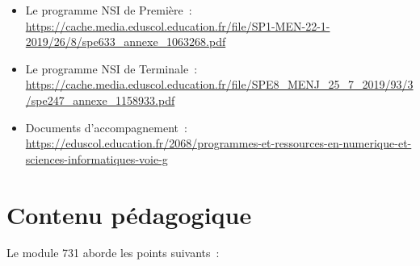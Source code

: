 \documentclass[french]{article}
\begin{document}
\begin{itemize}
    \item Le programme NSI de Première~:\\ \url{https://cache.media.eduscol.education.fr/file/SP1-MEN-22-1-2019/26/8/spe633_annexe_1063268.pdf}
    \item Le programme NSI de Terminale~:\\ \url{https://cache.media.eduscol.education.fr/file/SPE8_MENJ_25_7_2019/93/3/spe247_annexe_1158933.pdf}
    \item Documents d'accompagnement~:\\ \url{https://eduscol.education.fr/2068/programmes-et-ressources-en-numerique-et-sciences-informatiques-voie-g}
\end{itemize}


\section{Contenu pédagogique}

Le module 731 aborde les points suivants~:
\end{document}
